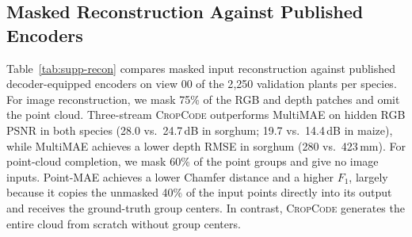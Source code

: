 \documentclass[10pt,twocolumn,letterpaper]{article}
\newcommand{\method}{\textsc{CropCode}}
\begin{document}
\subsection{Masked Reconstruction Against Published Encoders}
\label{sec:supp-recon}

Table~\ref{tab:supp-recon} compares masked input reconstruction against published decoder-equipped encoders on view 00 of the 2{,}250 validation plants per species. For image reconstruction, we mask 75\% of the RGB and depth patches and omit the point cloud. Three-stream \method{} outperforms MultiMAE on hidden RGB PSNR in both species (28.0 vs.\ 24.7\,dB in sorghum; 19.7 vs.\ 14.4\,dB in maize), while MultiMAE achieves a lower depth RMSE in sorghum (280 vs.\ 423\,mm). For point-cloud completion, we mask 60\% of the point groups and give no image inputs. Point-MAE achieves a lower Chamfer distance and a higher $F_1$, largely because it copies the unmasked 40\% of the input points directly into its output and receives the ground-truth group centers. In contrast, \method{} generates the entire cloud from scratch without group centers.
\end{document}
